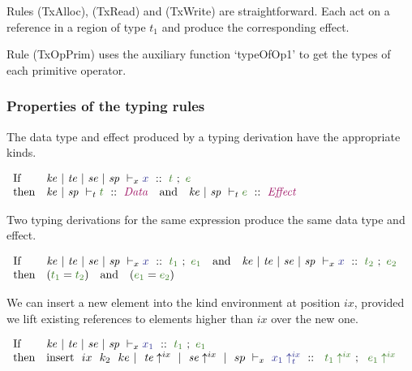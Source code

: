 Rules (TxAlloc), (TxRead) and (TxWrite) are straightforward. Each act on a reference in a region of type $t_1$ and produce the corresponding effect.

Rule (TxOpPrim) uses the auxiliary function `typeOfOp1' to get the types of each primitive operator.


\subsubsection{Properties of the typing rules}

\begin{lemma}
\label{l:typex_kind_type_effect}
The data type and effect produced by a typing derivation have the appropriate kinds.
\end{lemma}

$
\begin{array}{ll}
    \pIf        & \TypeX{\mke}{\mte}{\mse}{\msp}
                        {x}{t}{e}
\\  \pthen      & \KindT{\mke}{\msp}{t}{\kcData}
 ~~~\pand~~~      \KindT{\mke}{\msp}{e}{\kcEffect}
\end{array}
$
\qqed


\begin{lemma}
Two typing derivations for the same expression produce the same data type and effect. 
\end{lemma}

$
\begin{array}{ll}
    \pIf        & \TypeX{\mke}{\mte}{\mse}{\msp}
                        {x}
                        {t_1}
                        {e_1}

 ~~~\pand~~~      \TypeX{\mke}{\mte}{\mse}{\msp}
                        {x}
                        {t_2}
                        {e_2}
\\ \pthen       & (\ct{t_1} = \ct{t_2}) 
~~~\pand~~~       (\ct{e_1} = \ct{e_2})
\end{array}
$
\qqed


\begin{lemma}
We can insert a new element into the kind environment at position $ix$, provided we lift existing references to elements higher than $ix$ over the new one. 
\end{lemma}

$
\begin{array}{ll}
    \pIf        & \TypeX{\mke}{\mte}{\mse}{\msp}
                        {x_1}
                        {t_1}
                        {e_1}
\\
    \pthen      & \TypeX{\trm{insert}~~ ix~~ k_2~~ ke}
                        {~\liftTE{ix}{\mte}}
                        {~\liftTE{ix}{\mse}}
                        {~sp}
                        {~\liftTX{ix}{x_1}}
                        {~\liftTT{ix}{t_1}}
                        {~\liftTT{ix}{e_1}}
\end{array}
$

